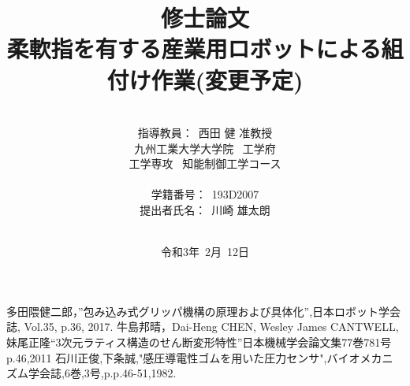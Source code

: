 \documentclass[a4paper,12pt]{jarticle}
\title{修士論文\\
柔軟指を有する産業用ロボットによる組付け作業(変更予定)\\
}
\author{\vspace{90mm}\\
指導教員：\ 西田 \hspace{0mm} 健 准教授\\
九州工業大学大学院\ \hspace{0mm} 工学府\\
工学専攻\ \hspace{0mm} 知能制御工学コース \\
\vspace{0mm}\\
学籍番号：\ 193D2007\\
提出者氏名：\ 川崎 \hspace{0mm} 雄太朗\\\vspace{5mm}\\ }
\date{令和3年\ 2月\ 12日}
\begin{document}
\titlepage
\maketitle
\thispagestyle{empty}
\newpage

\thispagestyle{empty}

\newpage
\tableofcontents


\newpage

\newpage
%
\newpage

\newpage

\newpage

\newpage
%




\begin{thebibliography}{99}

 多田隈健二郎，”包み込み式グリッパ機構の原理および具体化”,日本ロボット学会誌, Vol.35, p.36, 2017.
牛島邦晴，Dai-Heng CHEN, Wesley James CANTWELL, 妹尾正隆“3次元ラティス構造のせん断変形特性”日本機械学会論文集77巻781号p.46,2011
 石川正俊,下条誠,"感圧導電性ゴムを用いた圧力センサ",バイオメカニズム学会誌,6巻,3号,p.p.46-51,1982.










\end{thebibliography}
\end{document}
